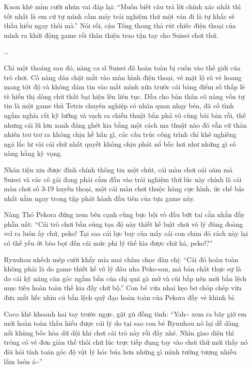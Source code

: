 \documentclass[../main.tex]{subfiles}
\begin{document}
Kuon khẽ mỉm cười nhún vai đáp lại: ``Muốn biết câu trả lời chính xác nhất thì tốt nhất là em cứ tự mình cầm máy trải nghiệm thử một ván đi là tự khắc sẽ thấu hiểu ngay thôi mà.'' Nói rồi, cậu Tổng thong thả rút chiếc điện thoại của mình ra khởi động game rồi thân thiện trao tận tay cho Suisei chơi thử.

\dots

Chỉ một thoáng sau đó, nàng ca sĩ Suisei đã hoàn toàn bị cuốn vào thế giới của trò chơi. Cô nàng dán chặt mắt vào màn hình điện thoại, vẻ mặt lộ rõ vẻ hoang mang tột độ và không dám tin vào mắt mình nữa trước cái bảng điểm số thấp lè tè hiển thị dòng chữ thất bại hiện lên liên tục. Dẫu cho bản thân cô nàng vốn tự tin là một game thủ Tetris chuyên nghiệp có nhãn quan nhạy bén, đã cố tình ngắm nghía rất kỹ lưỡng và vạch ra chiến thuật bắn phá vô cùng bài bản rồi, thế nhưng cái lũ lơn xanh đáng ghét kia bằng một cách ma thuật nào đó vẫn cứ thản nhiên trơ trơ ra không chịu hề hấn gì, các cấu trúc công trình chỉ khẽ nghiêng ngả lắc lư vài cái chứ nhất quyết không chịu phát nổ bốc hơi như những gì cô nàng hằng kỳ vọng.

Nhân tiện xin được đính chính thông tin một chút, cái màn chơi oái oăm mà Suisei và các cô gái đang phải cắm đầu vào trải nghiệm thử lúc này chính là cái màn chơi số 3-19 huyền thoại, một cái màn chơi thuộc hàng cực hình, ức chế bậc nhất nằm ngay trong tập phát hành đầu tiên của tựa game này.

Nàng Thỏ Pekora đứng xem bên cạnh cũng bực bội vò đầu bứt tai cằn nhằn đầy phẫn uất: ``Cái trò chơi bắn súng tọa độ này thiết kế luật chơi vô lý đùng đoàng vcl ra luôn ấy chứ, peko! Tại sao cái lực bay của mấy cái con chim đỏ rách này lại có thể yếu ớt bèo bọt đến cái mức phi lý thế kia được chứ hả, peko!?''

Ryuuhou nhếch mép cười khẩy mỉa mai châm chọc đàn chị: ``Cái đó hoàn toàn không phải là do game thiết kế vô lý đâu nha Peko-san, mà bản chất thực sự là do cái kỹ năng căn góc ngắm bắn của chị quá gà mờ và cùi bắp nên mới bắn lệch mục tiêu hoàn toàn thế kia đấy chứ bộ.'' Con bé vừa nhai kẹo bơ chóp chép vừa đưa mắt liếc nhìn cú bắn lệch quỹ đạo hoàn toàn của Pekora đầy vẻ khinh bỉ.

Coco khẽ khoanh hai tay trước ngực, gật gù đồng tình: ``Yah\~{} xem ra bây giờ em mới hoàn toàn thấu hiểu được cái lý do tại sao con bé Ryuuhou nó lại dễ dàng nổi khùng bốc hỏa dữ dội khi chơi cái trò này rồi đấy nhé. Nhìn giao diện thì trông có vẻ đơn giản thế thôi chứ lúc trực tiếp đụng tay vào chơi thử mới thấy nó đòi hỏi tính toán góc độ vật lý hóc búa hơn những gì mình tưởng tượng nhiều lắm luôn á\~{}''
\end{document}
